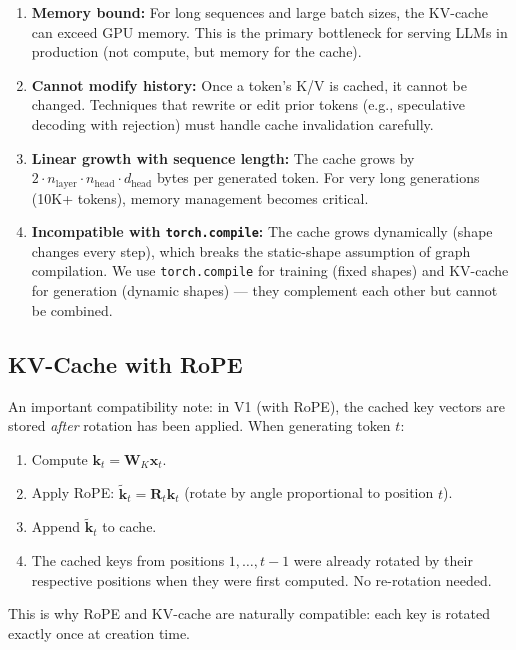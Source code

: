 \documentclass[11pt, a4paper]{article}
\theoremstyle{definition}
\newcommand{\vx}{\bm{x}}
\newcommand{\vk}{\bm{k}}
\newcommand{\mW}{\bm{W}}
\newcommand{\mR}{\bm{R}}
\newcommand{\dhead}{d_{\text{head}}}
\newcommand{\nhead}{n_{\text{head}}}
\newcommand{\nlayer}{n_{\text{layer}}}
\begin{document}
\begin{enumerate}
    \item \textbf{Memory bound:} For long sequences and large batch sizes, the KV-cache can exceed GPU memory. This is the primary bottleneck for serving LLMs in production (not compute, but memory for the cache).
    
    \item \textbf{Cannot modify history:} Once a token's K/V is cached, it cannot be changed. Techniques that rewrite or edit prior tokens (e.g., speculative decoding with rejection) must handle cache invalidation carefully.
    
    \item \textbf{Linear growth with sequence length:} The cache grows by $2 \cdot \nlayer \cdot \nhead \cdot \dhead$ bytes per generated token. For very long generations (10K+ tokens), memory management becomes critical.
    
    \item \textbf{Incompatible with \texttt{torch.compile}:} The cache grows dynamically (shape changes every step), which breaks the static-shape assumption of graph compilation. We use \texttt{torch.compile} for training (fixed shapes) and KV-cache for generation (dynamic shapes) — they complement each other but cannot be combined.
\end{enumerate}

\subsection{KV-Cache with RoPE}

An important compatibility note: in V1 (with RoPE), the cached key vectors are stored \emph{after} rotation has been applied. When generating token $t$:
\begin{enumerate}
    \item Compute $\vk_t = \mW_K \vx_t$.
    \item Apply RoPE: $\tilde{\vk}_t = \mR_t \vk_t$ (rotate by angle proportional to position $t$).
    \item Append $\tilde{\vk}_t$ to cache.
    \item The cached keys from positions $1, \ldots, t-1$ were already rotated by their respective positions when they were first computed. No re-rotation needed.
\end{enumerate}
This is why RoPE and KV-cache are naturally compatible: each key is rotated exactly once at creation time.
\end{document}
